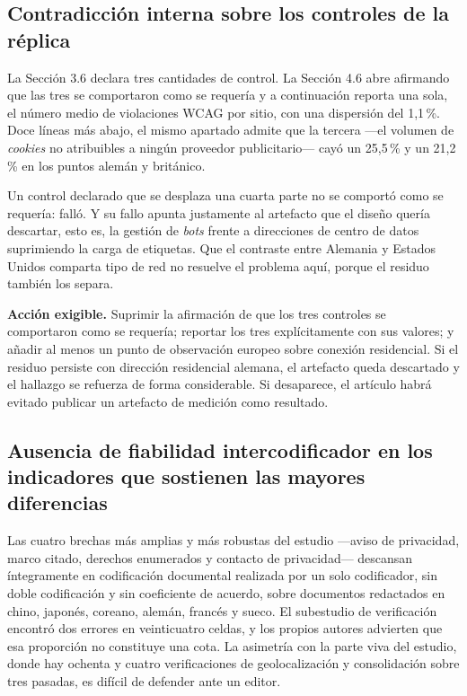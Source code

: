 \documentclass[11pt,a4paper]{article}
\begin{document}
\subsection{Contradicci\'on interna sobre los controles de la r\'eplica}

La Secci\'on 3.6 declara tres cantidades de control. La Secci\'on 4.6 abre afirmando que las tres se comportaron como se requer\'ia y a continuaci\'on reporta una sola, el n\'umero medio de violaciones WCAG por sitio, con una dispersi\'on del 1,1\,\%. Doce l\'ineas m\'as abajo, el mismo apartado admite que la tercera ---el volumen de \emph{cookies} no atribuibles a ning\'un proveedor publicitario--- cay\'o un 25,5\,\% y un 21,2\,\% en los puntos alem\'an y brit\'anico.

Un control declarado que se desplaza una cuarta parte no se comport\'o como se requer\'ia: fall\'o. Y su fallo apunta justamente al artefacto que el dise\~no quer\'ia descartar, esto es, la gesti\'on de \emph{bots} frente a direcciones de centro de datos suprimiendo la carga de etiquetas. Que el contraste entre Alemania y Estados Unidos comparta tipo de red no resuelve el problema aqu\'i, porque el residuo tambi\'en los separa.

\textbf{Acci\'on exigible.} Suprimir la afirmaci\'on de que los tres controles se comportaron como se requer\'ia; reportar los tres expl\'icitamente con sus valores; y a\~nadir al menos un punto de observaci\'on europeo sobre conexi\'on residencial. Si el residuo persiste con direcci\'on residencial alemana, el artefacto queda descartado y el hallazgo se refuerza de forma considerable. Si desaparece, el art\'iculo habr\'a evitado publicar un artefacto de medici\'on como resultado.

\subsection{Ausencia de fiabilidad intercodificador en los indicadores que sostienen las mayores diferencias}

Las cuatro brechas m\'as amplias y m\'as robustas del estudio ---aviso de privacidad, marco citado, derechos enumerados y contacto de privacidad--- descansan \'integramente en codificaci\'on documental realizada por un solo codificador, sin doble codificaci\'on y sin coeficiente de acuerdo, sobre documentos redactados en chino, japon\'es, coreano, alem\'an, franc\'es y sueco. El subestudio de verificaci\'on encontr\'o dos errores en veinticuatro celdas, y los propios autores advierten que esa proporci\'on no constituye una cota. La asimetr\'ia con la parte viva del estudio, donde hay ochenta y cuatro verificaciones de geolocalizaci\'on y consolidaci\'on sobre tres pasadas, es dif\'icil de defender ante un editor.
\end{document}
